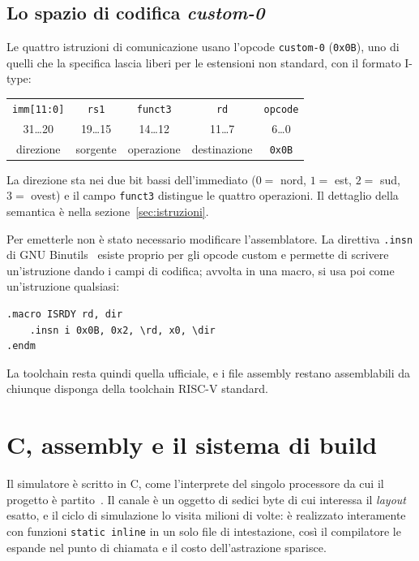 \subsection{Lo spazio di codifica \emph{custom-0}}
\label{sec:custom0}

Le quattro istruzioni di comunicazione usano l'opcode \texttt{custom-0}
(\texttt{0x0B}), uno di quelli che la specifica lascia liberi per le estensioni
non standard, con il formato I-type:

\begin{center}
\begin{tabular}{ccccc}
    \toprule
    \texttt{imm[11:0]} & \texttt{rs1} & \texttt{funct3} & \texttt{rd} & \texttt{opcode} \\
    31\dots20 & 19\dots15 & 14\dots12 & 11\dots7 & 6\dots0 \\
    \midrule
    direzione & sorgente & operazione & destinazione & \texttt{0x0B} \\
    \bottomrule
\end{tabular}
\end{center}
La direzione sta nei due bit bassi dell'immediato ($0 = $ nord, $1 = $ est,
$2 = $ sud, $3 = $ ovest) e il campo \texttt{funct3} distingue le quattro
operazioni. Il dettaglio della semantica è nella
sezione~\ref{sec:istruzioni}.

Per emetterle non è stato necessario modificare l'assemblatore. La direttiva
\texttt{.insn} di GNU Binutils~\cite{Binutils} esiste proprio per gli opcode
custom e permette di scrivere un'istruzione dando i campi di codifica;
avvolta in una macro, si usa poi come un'istruzione qualsiasi:

\begin{lstlisting}[caption={La macro con cui il programma della cella emette \texttt{ISRDY}},label={lst:macro},language=RISCV,float=htbp]
.macro ISRDY rd, dir
    .insn i 0x0B, 0x2, \rd, x0, \dir
.endm
\end{lstlisting}
La toolchain resta quindi quella ufficiale, e i file assembly restano
assemblabili da chiunque disponga della toolchain RISC-V standard.

\section{C, assembly e il sistema di build}
\label{sec:c-assembly}

Il simulatore è scritto in C, come l'interprete del singolo processore da
cui il progetto è partito~\cite{TesiStella}. Il canale è un oggetto di
sedici byte di cui interessa il \emph{layout} esatto, e il
ciclo di simulazione lo visita milioni di volte: è realizzato
interamente con funzioni \texttt{static inline} in un solo file di
intestazione, così il compilatore le espande nel punto di chiamata e il
costo dell'astrazione sparisce.

